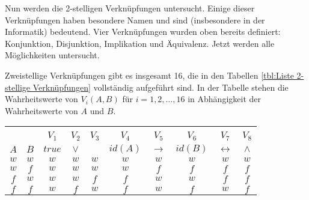 \begin{Unit}
Nun werden die 2-stelligen Verknüpfungen untersucht. Einige dieser 
Verknüpfungen haben besondere Namen und sind (insbesondere in der Informatik)
bedeutend. Vier Verknüpfungen wurden oben bereits definiert: Konjunktion,
Disjunktion, Implikation und Äquivalenz. Jetzt werden alle Möglichkeiten 
untersucht.

Zweistellige Verknüpfungen gibt es insgesamt 16, die in den Tabellen 
\ref{tbl:Liste 2-stellige Verknüpfungen} vollständig aufgeführt sind. In der 
Tabelle stehen die Wahrheitswerte von $V_i(A,B)$ für $i = 1, 2, \ldots, 16$ in
Abhängigkeit der Wahrheitswerte von $A$ und $B$. \vspace{1ex}

\begin{table}[htbp] 
\begin{center}
\begin{tabular}{c|c||c|c|c|c|c|c|c|c}
 & & \hspace*{1.00cm} & \hspace*{1.00cm} & \hspace*{1.00cm} &   
  \hspace*{1.00cm} & \hspace*{1.00cm} & \hspace*{1.00cm} & 
  \hspace*{1.00cm} & \hspace*{1.00cm} \\
 & & $V_1$ & $V_2$ & $V_3$ & $V_4$ & $V_5$ & $V_6$ & $V_7$ & $V_8$ \\
 $A$ & $B$ & $true$ & $\lor$ &  & $id(A)$ & $\rightarrow$ 
   & $id(B)$ & $\leftrightarrow$ & $\land$ \\ \hline
  $w$ & $w$ & $w$ & $w$ & $w$ & $w$ & $w$ & $w$ & $w$ & $w$ \\
  $w$ & $f$ & $w$ & $w$ & $w$ & $w$ & $f$ & $f$ & $f$ & $f$ \\
  $f$ & $w$ & $w$ & $w$ & $f$ & $f$ & $w$ & $w$ & $f$ & $f$ \\
  $f$ & $f$ & $w$ & $f$ & $w$ & $f$ & $w$ & $f$ & $w$ & $f$ \\
\end{tabular}

\vspace*{1.0ex}


\end{center}
\end{table}
\end{Unit}
